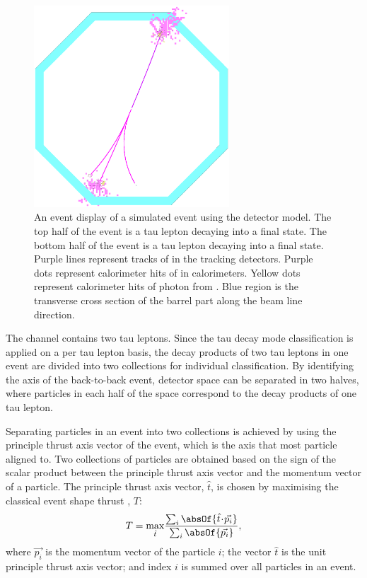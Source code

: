 \begin{figure}[tbph]
\centering
\includegraphics[width=0.65\textwidth]{tau/tau_evt_dsp2}
\caption{ An event display of a simulated \eeToTauTau event using the \ILD detector model. The top half of the event is a tau lepton decaying into a \decayRhoFinalState final state. The bottom half of the event is a tau lepton decaying into a \decayThreePionPhoton final state. Purple lines represent tracks of \Ppipm in the tracking detectors. Purple dots represent  calorimeter hits of \Ppipm in calorimeters. Yellow dots represent calorimeter hits of photon from \HepProcess{\Ppizero \to \Pphoton \Pphoton}. Blue region is the transverse cross section of the \ECAL barrel part along the beam line direction.}
\label{fig:tauEvtDsp}
\end{figure}


The \eeToTauTau channel contains two tau leptons. Since the tau decay mode classification is applied on a per tau lepton basis, the decay products of two tau leptons in one event are divided into two collections for individual classification. By identifying the axis of the back-to-back \eeToTauTau event, detector space can be separated in two halves, where particles in each half of the space correspond to the decay products of one tau lepton.

Separating particles in an event into two collections is achieved by using the principle thrust axis vector of the event, which is the axis that most particle aligned to. Two collections of particles are obtained based on the sign of the scalar product between the principle thrust axis vector  and the momentum vector of a particle. The principle thrust axis vector, $\hat{t}$, is chosen by maximising the classical event shape thrust \cite{PhysRevLett.39.1587}, $T$:
\begin{equation}
T = \max_{\hat{t}}\!\frac{\sum_{i}\absOf{\hat{t}\!\cdot\!\vec{p_{i}}}}{\sum_{i}\absOf{\vec{p_{i}}}},
\end{equation}
where $\vec{p_{i}}$ is the momentum vector of the particle $i$;  the vector $\hat{t}$ is the unit principle thrust axis vector; and index $i$ is summed over all particles in an event.


